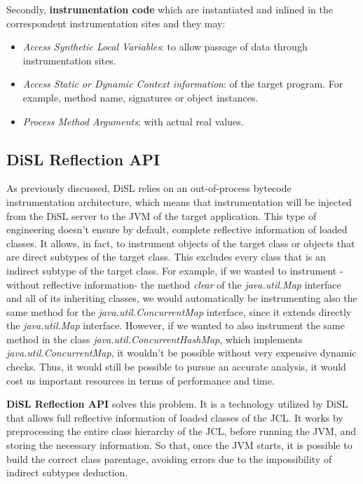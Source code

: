 \documentclass[]{usiinfthesis}
\begin{document}
Secondly, \textbf{instrumentation code} which are instantiated and inlined in the correspondent instrumentation sites and they may:
\begin{itemize}
    \item \textit{Access Synthetic Local Variables}: to allow passage of data through instrumentation sites.
    \item \textit{Access Static or Dynamic Context information}: of the target program. For example, method name, signatures or object instances.
    \item \textit{Process Method Arguments}: with actual real values.
\end{itemize}

\subsection{DiSL Reflection API}
As previously discussed, DiSL relies on an out-of-process bytecode instrumentation architecture, which means that instrumentation will be injected from the DiSL server to the JVM of the target application. This type of engineering doesn't ensure by default, complete reflective information of loaded classes. It allows, in fact, to instrument objects of the target class or objects that are direct subtypes of the target class. This excludes every class that is an indirect subtype of the target class. For example, if we wanted to instrument -without reflective information- the method \textit{clear} of the \textit{java.util.Map} interface and all of its inheriting classes, we would automatically be instrumenting also the same method for the \textit{java.util.ConcurrentMap} interface, since it extends directly the \textit{java.util.Map} interface. However, if we wanted to also instrument the same method in the class \textit{java.util.ConcurrentHashMap}, which implements \textit{java.util.ConcurrentMap}, it wouldn't be possible without very expensive dynamic checks. Thus, it would still be possible to pursue an accurate analysis, it would cost us important resources in terms of performance and time.

\textbf{DiSL Reflection API} solves this problem. It is a technology utilized by DiSL that allows full reflective information of loaded classes of the JCL. It works by preprocessing the entire class hierarchy of the JCL, before running the JVM, and storing the necessary information. So that, once the JVM starts, it is possible to build the correct class parentage, avoiding errors due to the impossibility of indirect subtypes deduction.
\end{document}

